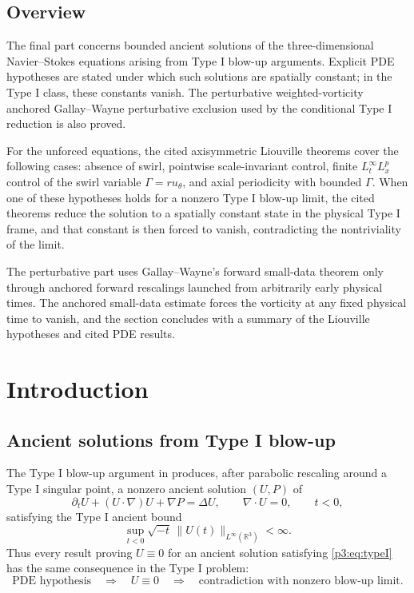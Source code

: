 \documentclass[11pt]{amsart}
\theoremstyle{plain}
\theoremstyle{definition}
\theoremstyle{remark}
\numberwithin{equation}{section}
\begin{document}
\subsection*{Overview}

The final part concerns bounded ancient solutions of the three-dimensional
Navier--Stokes equations arising from Type I blow-up arguments.  Explicit PDE
hypotheses are stated under which such solutions are spatially constant; in the
Type I class, these constants vanish.  The perturbative weighted-vorticity
anchored Gallay--Wayne perturbative exclusion used by the conditional Type I
reduction is also proved.

For the unforced equations, the cited axisymmetric Liouville theorems cover the
following cases: absence of swirl, pointwise scale-invariant control, finite
\(L_t^\infty L_x^p\) control of the swirl variable \(\Gamma=ru_\theta\), and
axial periodicity with bounded \(\Gamma\).  When one of these hypotheses holds
for a nonzero Type I blow-up limit, the cited theorems reduce the solution to a
spatially constant state in the physical Type I frame, and that constant is
then forced to vanish, contradicting the nontriviality of the limit.

The perturbative part uses Gallay--Wayne's forward small-data theorem only
through anchored forward rescalings launched from arbitrarily early physical
times.  The anchored small-data estimate forces the vorticity at any fixed
physical time to vanish, and the section concludes with a summary of the
Liouville hypotheses and cited PDE results.

\section{Introduction}

\subsection{Ancient solutions from Type I blow-up}

The Type I blow-up argument in  produces, after
parabolic rescaling around a Type I singular point, a nonzero ancient solution
\((U,P)\) of
\begin{equation}\label{p3:eq:NS}
   \partial_tU+(U\cdot\nabla)U+\nabla P=\Delta U,
   \qquad \nabla\cdot U=0,
   \qquad t<0,
\end{equation}
satisfying the Type I ancient bound
\begin{equation}\label{p3:eq:typeI}
   \sup_{t<0}\sqrt{-t}\,
   \|U(t)\|_{L^\infty(\mathbb R^3)}<\infty .
\end{equation}
Thus every result proving \(U\equiv0\) for an ancient solution satisfying
\eqref{p3:eq:typeI} has the same consequence in the Type I problem:
\[
   \text{PDE hypothesis}
   \quad\Longrightarrow\quad
   U\equiv0
   \quad\Longrightarrow\quad
   \text{contradiction with nonzero blow-up limit}.
\]
\end{document}
